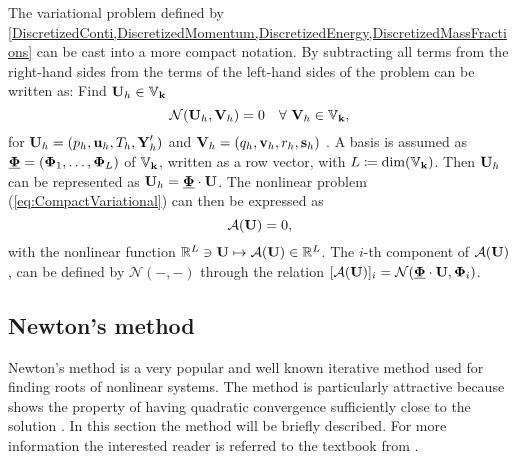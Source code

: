 The variational problem defined by \cref*{DiscretizedConti,DiscretizedMomentum,DiscretizedEnergy,DiscretizedMassFractions} can be cast into a more compact notation. By subtracting all terms from the right-hand sides from the terms of the left-hand sides of  the problem can be written as:
Find $\textbf{U}_h \in \mathbb{V}_{\textbf{k}}$
\begin{equation}
	\mathcal{N}(\textbf{U}_h,\textbf{V}_h) = 0 \quad \forall \ \textbf{V}_h \in \mathbb{V}_{\textbf{k}} ,
	\label{eq:CompactVariational}
\end{equation}
for
$\textbf{U}_h = (p_h,\textbf{u}_h, T_h, \textbf{Y}'_h)$ and
$\textbf{V}_h = (q_h,\textbf{v}_h, r_h, \mathbf{s}_h)$
. A basis is assumed as
$\underline{\boldsymbol{\Phi}} = ( \boldsymbol{\Phi}_1, \ldots , \boldsymbol{\Phi}_L )$ of $\mathbb{V}_{\textbf{k}}$,
written as a row vector, with $L \coloneqq \textrm{dim}(\mathbb{V}_{\textbf{k}})$.
Then $\textbf{U}_h$ can be represented as
$ \textbf{U}_h =  \underline{ \boldsymbol{\Phi} } \cdot \textbf{U} $.
The nonlinear problem (\ref{eq:CompactVariational}) can then be expressed as
\begin{equation}
	\mathcal{A}(\textbf{U}) = 0 ,
	\label{Eq:nonLinSystem}
\end{equation}
with the nonlinear function
$\mathbb{R}^L \ni \textbf{U} \mapsto \mathcal{A}(\textbf{U}) \in \mathbb{R}^L$.
The $i$-th component of $ \mathcal{A}(\textbf{U})$, can be defined by $\mathcal{N}(-,-)$ through the relation
$[\mathcal{A}(\textbf{U})]_i = \mathcal{N}( \underline{ \boldsymbol{\Phi} } \cdot \textbf{U} , \boldsymbol{\Phi}_i)$.

\subsection{Newton's method}
Newton's method is a very popular and well known iterative method used for finding roots of nonlinear systems. The method is particularly attractive because shows the property of having quadratic convergence sufficiently close to the solution \parencite{deuflhardNewtonMethodsNonlinear2011}. In this section the method will be briefly described. For more information the interested reader is referred to the textbook from \textcite{kelleyIterativeMethodsLinear1995}. 

